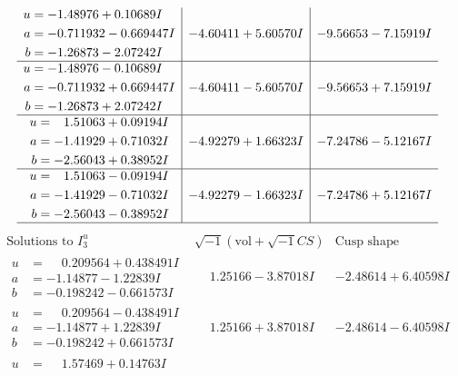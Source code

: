 \documentclass[1p]{elsarticle_modified}
\theoremstyle{definition}
\newcommand{\I}{\sqrt{-1}}
\begin{document}
$$\begin{array}{c|c|c}
\begin{aligned}
u &= -1.48976 + 0.10689 I \\
a &= -0.711932 - 0.669447 I \\
b &= -1.26873 - 2.07242 I\end{aligned}
 & -4.60411 + 5.60570 I & -9.56653 - 7.15919 I \\ \hline\begin{aligned}
u &= -1.48976 - 0.10689 I \\
a &= -0.711932 + 0.669447 I \\
b &= -1.26873 + 2.07242 I\end{aligned}
 & -4.60411 - 5.60570 I & -9.56653 + 7.15919 I \\ \hline\begin{aligned}
u &= \phantom{-}1.51063 + 0.09194 I \\
a &= -1.41929 + 0.71032 I \\
b &= -2.56043 + 0.38952 I\end{aligned}
 & -4.92279 + 1.66323 I & -7.24786 - 5.12167 I \\ \hline\begin{aligned}
u &= \phantom{-}1.51063 - 0.09194 I \\
a &= -1.41929 - 0.71032 I \\
b &= -2.56043 - 0.38952 I\end{aligned}
 & -4.92279 - 1.66323 I & -7.24786 + 5.12167 I\\
 \hline 
 \end{array}$$\newpage$$\begin{array}{c|c|c}  
\text{Solutions to }I^u_{3}& \I (\text{vol} + \sqrt{-1}CS) & \text{Cusp shape}\\
 \hline 
\begin{aligned}
u &= \phantom{-}0.209564 + 0.438491 I \\
a &= -1.14877 - 1.22839 I \\
b &= -0.198242 - 0.661573 I\end{aligned}
 & \phantom{-}1.25166 - 3.87018 I & -2.48614 + 6.40598 I \\ \hline\begin{aligned}
u &= \phantom{-}0.209564 - 0.438491 I \\
a &= -1.14877 + 1.22839 I \\
b &= -0.198242 + 0.661573 I\end{aligned}
 & \phantom{-}1.25166 + 3.87018 I & -2.48614 - 6.40598 I \\ \hline\begin{aligned}
u &= \phantom{-}1.57469 + 0.14763 I \\

\end{aligned}
\end{array}$$
\end{document}
